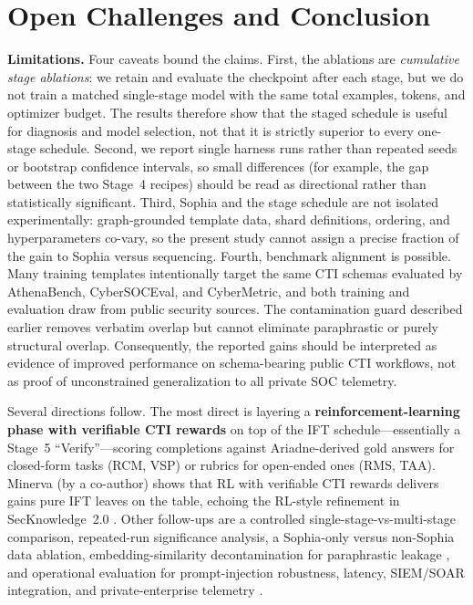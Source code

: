 \documentclass[conference]{IEEEtran}
\begin{document}
\section{Open Challenges and Conclusion}
\label{sec:open-challenges}

\textbf{Limitations.} Four caveats bound the claims. First, the ablations are \emph{cumulative stage ablations}: we retain and evaluate the checkpoint after each stage, but we do not train a matched single-stage model with the same total examples, tokens, and optimizer budget. The results therefore show that the staged schedule is useful for diagnosis and model selection, not that it is strictly superior to every one-stage schedule. Second, we report single harness runs rather than repeated seeds or bootstrap confidence intervals, so small differences (for example, the gap between the two Stage~4 recipes) should be read as directional rather than statistically significant. Third, Sophia and the stage schedule are not isolated experimentally: graph-grounded template data, shard definitions, ordering, and hyperparameters co-vary, so the present study cannot assign a precise fraction of the gain to Sophia versus sequencing. Fourth, benchmark alignment is possible. Many training templates intentionally target the same CTI schemas evaluated by AthenaBench, CyberSOCEval, and CyberMetric, and both training and evaluation draw from public security sources. The contamination guard described earlier removes verbatim overlap but cannot eliminate paraphrastic or purely structural overlap. Consequently, the reported gains should be interpreted as evidence of improved performance on schema-bearing public CTI workflows, not as proof of unconstrained generalization to all private SOC telemetry.

Several directions follow. The most direct is layering a \textbf{reinforcement-learning phase with verifiable CTI rewards} on top of the IFT schedule---essentially a Stage~5 ``Verify''---scoring completions against Ariadne-derived gold answers for closed-form tasks (RCM, VSP) or rubrics for open-ended ones (RMS, TAA). Minerva \cite{alam2026minerva} (by a co-author) shows that RL with verifiable CTI rewards delivers gains pure IFT leaves on the table, echoing the RL-style refinement in SecKnowledge~2.0 \cite{levi2025toward}. Other follow-ups are a controlled single-stage-vs-multi-stage comparison, repeated-run significance analysis, a Sophia-only versus non-Sophia data ablation, embedding-similarity decontamination for paraphrastic leakage \cite{yang2023contamination,groeneveld2024olmo}, and operational evaluation for prompt-injection robustness, latency, SIEM/SOAR integration, and private-enterprise telemetry \cite{hu2024seceval,liu2024cyberbench,alam2025athenabench}.
\end{document}
